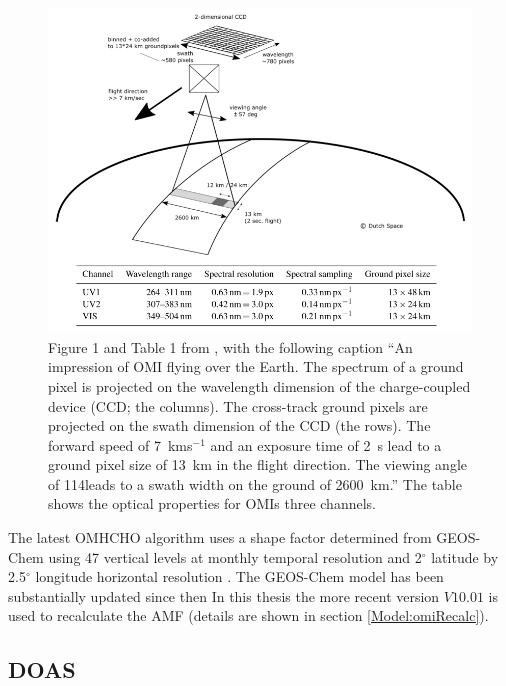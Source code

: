     
    
    \begin{figure}
      \includegraphics[width=\textwidth]{Figures/Shenkeveld_OMI_summary.png}
      \caption{ %
        Figure 1 and Table 1 from \textcite{Schenkeveld2017}, with the following caption ``An impression of OMI flying over the Earth.
        The spectrum of a ground pixel is projected on the wavelength dimension of the charge-coupled device (CCD; the columns). 
        The cross-track ground pixels are projected on the swath dimension of the CCD (the rows).
        The forward speed of 7~kms$^{-1}$ and an exposure time of 2~s lead to a ground pixel size of 13~km in the flight direction.
        The viewing angle of 114\degr leads to a swath width on the ground of 2600~km.''
        The table shows the optical properties for OMIs three channels.}
      \label{LR:HCHO:Sat:fig_Shenkeveld_OMI_summary}
    \end{figure}
  
    The latest OMHCHO algorithm uses a shape factor determined from GEOS-Chem using 47 vertical levels at monthly temporal resolution and 2$^{\circ}$ latitude by 2.5$^{\circ}$ longitude horizontal resolution \parencite{Abad2015}.
    The GEOS-Chem model has been substantially updated since then
    In this thesis the more recent version $V10.01$ is used to recalculate the AMF (details are shown in section \ref{Model:omiRecalc}).
    
  \subsection{DOAS}
    \label{Model:omhcho:DOAS}
    
